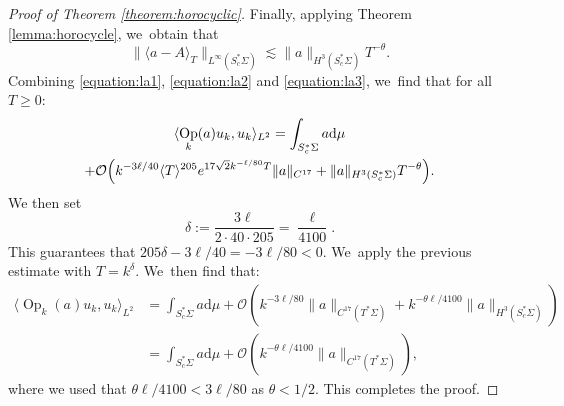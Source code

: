 \documentclass[JEP,XML,SOM,Unicode,published]{cedram}
\theoremstyle{plain}
\theoremstyle{definition}
\let\mc\mathcal
\newcommand{\dd}{\mathrm{d}}
\DeclareMathOperator{\Op}{Op}
\begin{document}
\begin{proof}[Proof of Theorem \ref{theorem:horocyclic}]
Finally, applying Theorem \ref{lemma:horocycle}, we~obtain that
\begin{equation}
\label{equation:la3}
\|\langle a-A\rangle_T\|_{L^\infty(S^*_c\Sigma)} \lesssim \|a\|_{H^{3}(S^*_c\Sigma)} T^{-\theta}.
\end{equation}
Combining \eqref{equation:la1}, \eqref{equation:la2} and \eqref{equation:la3}, we~find that for all $T \geq 0$:
\begin{multline*}
\langle \Op_k(a)u_k,u_k\rangle_{L^2}= \int_{S^*_c\Sigma} a \dd \mu \\
+ \mc{O}\Bigl(k^{-3\ell/40} \langle T\rangle^{205} e^{17\sqrt{2}k^{-\ell/80} T} \|a\|_{C^{17}} + \|a\|_{H^{3}(S^*_c\Sigma)} T^{-\theta}\Bigr).
\end{multline*}
We then set
\[
\delta := \dfrac{3 \ell}{2 \cdot 40 \cdot 205} = \dfrac{\ell}{4100}.
\]
This guarantees that $205 \delta-3\ell/40 =-3\ell/80 < 0$. We~apply the previous estimate with $T = k^{\delta}$. We~then find that:
\[
\begin{split}
\langle \Op_k(a)u_k,u_k\rangle_{L^2} &= \int_{S^*_c\Sigma} a \dd \mu + \mc{O}(k^{-3\ell/80} \|a\|_{C^{17}(T^*\Sigma)} + k^{-\theta \ell/4100}\|a\|_{H^3(S^*_c\Sigma)}) \\
& = \int_{S^*_c\Sigma} a \dd \mu + \mc{O}(k^{-\theta \ell/4100}\|a\|_{C^{17}(T^*\Sigma)}),
\end{split}
\]
where we used that $\theta \ell/4100 < 3\ell/80$ as $\theta < 1/2$. This completes the proof.
\end{proof}




\end{document}
